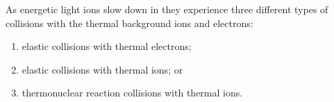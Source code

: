 \documentclass[../main.tex]{subfiles}
\begin{document}
As energetic light ions slow down in they experience three different types of collisions with the thermal background ions and electrons: 
\begin{enumerate}
    \item elastic collisions with thermal electrons;
    \item elastic collisions with thermal ions; or
    \item thermonuclear reaction collisions with thermal ions.
\end{enumerate}






\end{document}
